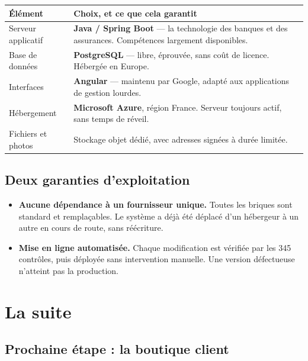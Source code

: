 \documentclass[11pt,a4paper]{article}
\begin{document}
\begin{center}
\begin{tabularx}{\textwidth}{@{}l>{\raggedright\arraybackslash}X@{}}
\toprule
\textbf{Élément} & \textbf{Choix, et ce que cela garantit} \\
\midrule
Serveur applicatif & \textbf{Java / Spring Boot} — la technologie des banques
et des assurances. Compétences largement disponibles. \\
\addlinespace
Base de données & \textbf{PostgreSQL} — libre, éprouvée, sans coût de licence.
Hébergée en Europe. \\
\addlinespace
Interfaces & \textbf{Angular} — maintenu par Google, adapté aux applications
de gestion lourdes. \\
\addlinespace
Hébergement & \textbf{Microsoft Azure}, région France. Serveur toujours actif,
sans temps de réveil. \\
\addlinespace
Fichiers et photos & Stockage objet dédié, avec adresses signées à durée
limitée. \\
\bottomrule
\end{tabularx}
\end{center}

\subsection{Deux garanties d'exploitation}

\begin{itemize}
  \item \textbf{Aucune dépendance à un fournisseur unique.} Toutes les briques
        sont standard et remplaçables. Le système a déjà été déplacé d'un
        hébergeur à un autre en cours de route, sans réécriture.
  \item \textbf{Mise en ligne automatisée.} Chaque modification est vérifiée
        par les 345 contrôles, puis déployée sans intervention manuelle. Une
        version défectueuse n'atteint pas la production.
\end{itemize}

\newpage
\section{La suite}

\subsection{Prochaine étape : la boutique client}
\end{document}
